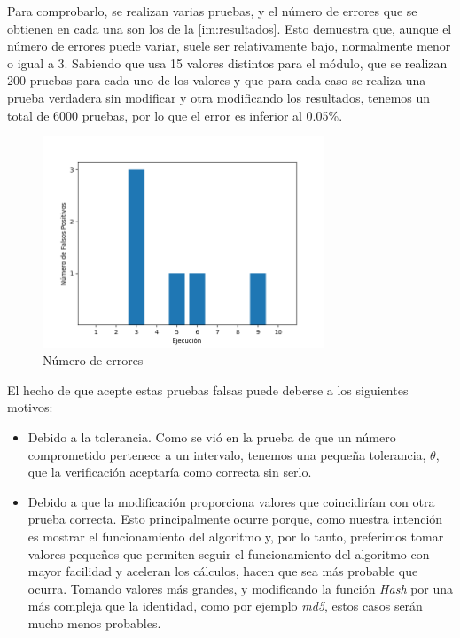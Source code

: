 Para comprobarlo, se realizan varias pruebas, y el número de errores que se obtienen en cada una son los de la \autoref{im:resultados}. Esto demuestra que, aunque el número de errores puede variar, suele ser relativamente bajo, normalmente menor o igual a 3. Sabiendo que usa 15 valores distintos para el módulo, que se realizan 200 pruebas para cada uno de los valores y que para cada caso se realiza una prueba verdadera sin modificar y otra modificando los resultados, tenemos un total de 6000 pruebas, por lo que el error es inferior al 0.05\%.

\begin{figure}[H]
    \centering
    \includegraphics[width=0.75\textwidth]{images/resultados.png}
    \caption{Número de errores}
    \label{im:resultados}
\end{figure}

El hecho de que acepte estas pruebas falsas puede deberse a los siguientes motivos:
\begin{itemize}
    \item Debido a la tolerancia. Como se vió en la prueba de que un número comprometido pertenece a un intervalo, tenemos una pequeña tolerancia, $\theta$, que la verificación aceptaría como correcta sin serlo.

    \item Debido a que la modificación proporciona valores que coincidirían con otra prueba correcta. Esto principalmente ocurre porque, como nuestra intención es mostrar el funcionamiento del algoritmo y, por lo tanto, preferimos tomar valores pequeños que permiten seguir el funcionamiento del algoritmo con mayor facilidad y aceleran los cálculos, hacen que sea más probable que ocurra. Tomando valores más grandes, y modificando la función \emph{Hash} por una más compleja que la identidad, como por ejemplo \emph{md5}, estos casos serán mucho menos probables.
\end{itemize}

